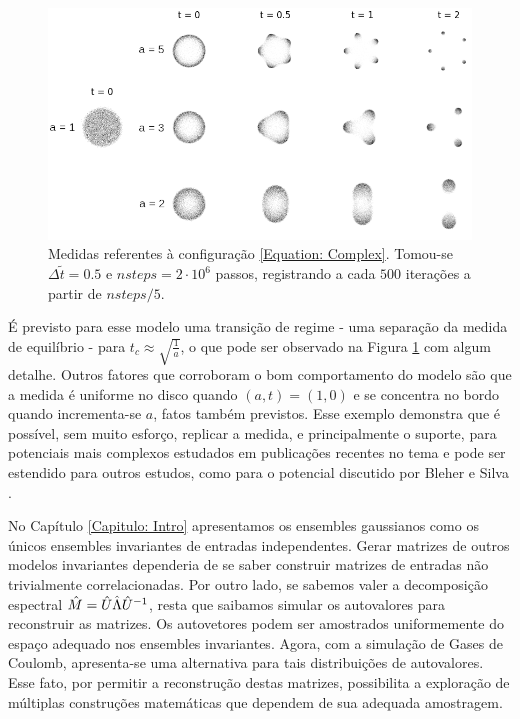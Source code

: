 \begin{figure}[ht]
	\centering
	\includegraphics[width=\textwidth]{Assets/complexPotential.png}
	\caption{Medidas referentes à configuração \eqref{Equation: Complex}. Tomou-se $\Delta \tilde{t} = 0.5$ e $nsteps = 2\cdot10^6$ passos, registrando a cada $500$ iterações a partir de $nsteps/5$.}
	\label{Figura: Complex}
\end{figure}

É previsto para esse modelo uma transição de regime - uma separação da medida de equilíbrio - para $t_c \approx \sqrt{\frac{1}{a}}$, o que pode ser observado na Figura \ref{Figura: Complex} com algum detalhe. Outros fatores que corroboram o bom comportamento do modelo são que a medida é uniforme no disco quando $(a,t) = (1,0)$ e se concentra no bordo quando incrementa-se $a$, fatos também previstos. \cite{balogh2016orthogonal} Esse exemplo demonstra que é possível, sem muito esforço, replicar a medida, e principalmente o suporte, para potenciais mais complexos estudados em publicações recentes no tema e pode ser estendido para outros estudos, como para o potencial discutido por Bleher e Silva \cite{Silva}. 

No Capítulo \ref{Capitulo: Intro} apresentamos os ensembles gaussianos como os únicos ensembles invariantes de entradas independentes. Gerar matrizes de outros modelos invariantes dependeria de se saber construir matrizes de entradas não trivialmente correlacionadas. Por outro lado, se sabemos valer a decomposição espectral $\hat M = \hat U \hat\Lambda \hat U^{-1}$, resta que saibamos simular os autovalores para reconstruir as matrizes. Os autovetores podem ser amostrados uniformemente do espaço adequado nos ensembles invariantes. Agora, com a simulação de Gases de Coulomb, apresenta-se uma alternativa para tais distribuições de autovalores. Esse fato, por permitir a reconstrução destas matrizes, possibilita a exploração de múltiplas construções matemáticas que dependem de sua adequada amostragem.

